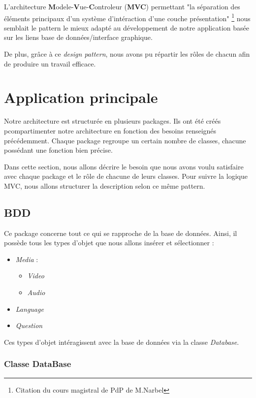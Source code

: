 L'architecture \textbf{M}odele-\textbf{V}ue-\textbf{C}ontroleur (\textbf{MVC}) permettant "la séparation des éléments principaux d'un système d'intéraction d'une couche présentation" \footnote{Citation du cours magistral de PdP de M.Narbel} nous semblait le pattern le mieux adapté au développement de notre application basée sur les liens base de données/interface graphique. 

De plus, grâce à ce \textit{design pattern}, nous avons pu répartir les rôles de chacun afin de produire un travail efficace.

\section{Application principale}

Notre architecture est structurée en plusieurs packages. Ils ont été créés pcompartimenter notre architecture en fonction des besoins renseignés précédemment. Chaque package regroupe un certain nombre de classes, chacune possédant une fonction bien précise.

Dans cette section, nous allons décrire le besoin que nous avons voulu satisfaire avec chaque package et le rôle de chacune de leurs classes. Pour suivre la logique MVC, nous allons structurer la description selon ce même pattern.


\subsection{BDD}

Ce package concerne tout ce qui se rapproche de la base de données. Ainsi, il possède tous les types d'objet que nous allons insérer et sélectionner :
\begin{itemize}
 \item \textit{Media} :
 \begin{itemize}
  \item \textit{Video}
  \item \textit{Audio}
 \end{itemize}
 \item \textit{Language}
 \item \textit{Question}
\end{itemize}
Ces types d'objet intéragissent avec la base de données via la classe \textit{Database}.


\subsubsection{Classe DataBase}

